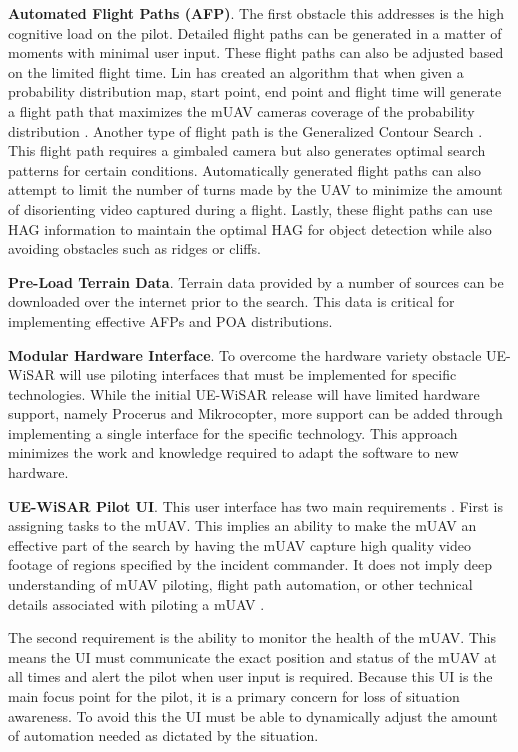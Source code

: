 \documentclass[12pt]{IEEEtran}
\begin{document}
\textbf{Automated Flight Paths (AFP)}.  The first obstacle this addresses is the
high cognitive load on the pilot.  Detailed flight paths can be generated in a matter of
moments with minimal user input.  These flight paths can also be adjusted based
on the limited flight time.  Lin has created an algorithm
that when given a probability distribution map, start point, end point and
flight time will generate a flight path that maximizes the mUAV cameras coverage
of the probability distribution \cite{lin2009uav}.  Another type of flight path
is the Generalized Contour Search \cite{goodrich2008supporting}.  This flight
path requires a gimbaled camera but also generates optimal search patterns for certain
conditions.  Automatically generated flight paths can also attempt to limit the
number of turns made by the UAV to minimize the amount of disorienting video
captured during a flight.  Lastly, these flight paths can use HAG information to
maintain the optimal HAG for object detection while also avoiding obstacles such
as ridges or cliffs.

\textbf{Pre-Load Terrain Data}.  Terrain data provided by a number of sources
can be downloaded over the internet prior to the search.  This data is critical for
implementing effective AFPs and POA distributions.

\textbf{Modular Hardware Interface}.  To overcome the hardware variety obstacle
UE-WiSAR will use piloting interfaces that must be implemented for specific technologies.
While the initial UE-WiSAR release will have limited hardware support, namely
Procerus and Mikrocopter, more support can be added through implementing a
single interface for the specific technology.  This approach minimizes the work and knowledge required to adapt
the software to new hardware.

\textbf{UE-WiSAR Pilot UI}.  This user interface has two main
requirements \cite{lin2010supporting}.  First is assigning tasks to the mUAV. 
This implies an ability to make the mUAV an effective part of the search by
having the mUAV capture high quality video footage of regions specified by the
incident commander.  It does not imply deep understanding of mUAV piloting,
flight path automation, or other technical details associated with piloting a
mUAV \cite{cooper2007supporting}.

The second requirement is the ability to monitor the health of the mUAV.
This means the UI must communicate the exact position and status of the mUAV at
all times and alert the pilot when user input is required.  Because this UI
is the main focus point for the pilot, it is a primary concern for loss of
situation awareness.  To avoid this the UI must be able to dynamically adjust
the amount of automation needed as dictated by the situation.
\end{document}
